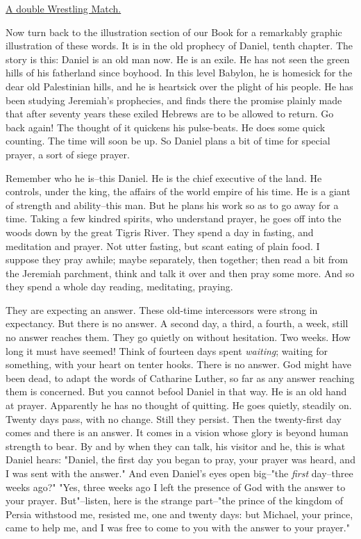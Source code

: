 \underline{A double Wrestling Match.}


Now turn back to the illustration section of our Book for a remarkably
graphic illustration of these words. It is in the old prophecy of Daniel,
tenth chapter. The story is this: Daniel is an old man now. He is an
exile. He has not seen the green hills of his fatherland since boyhood. In
this level Babylon, he is homesick for the dear old Palestinian hills, and
he is heartsick over the plight of his people. He has been studying
Jeremiah's prophecies, and finds there the promise plainly made that after
seventy years these exiled Hebrews are to be allowed to return. Go back
again! The thought of it quickens his pulse-beats. He does some quick
counting. The time will soon be up. So Daniel plans a bit of time for
special prayer, a sort of siege prayer.

Remember who he is--this Daniel. He is the chief executive of the land. He
controls, under the king, the affairs of the world empire of his time. He
is a giant of strength and ability--this man. But he plans his work so as
to go away for a time. Taking a few kindred spirits, who understand
prayer, he goes off into the woods down by the great Tigris River. They
spend a day in fasting, and meditation and prayer. Not utter fasting, but
scant eating of plain food. I suppose they pray awhile; maybe separately,
then together; then read a bit from the Jeremiah parchment, think and talk
it over and then pray some more. And so they spend a whole day reading,
meditating, praying.

They are expecting an answer. These old-time intercessors were strong in
expectancy. But there is no answer. A second day, a third, a fourth, a
week, still no answer reaches them. They go quietly on without hesitation.
Two weeks. How long it must have seemed! Think of fourteen days spent
\textit{waiting}; waiting for something, with your heart on tenter hooks. There
is no answer. God might have been dead, to adapt the words of Catharine
Luther, so far as any answer reaching them is concerned. But you cannot
befool Daniel in that way. He is an old hand at prayer. Apparently he has
no thought of quitting. He goes quietly, steadily on. Twenty days pass,
with no change. Still they persist. Then the twenty-first day comes and
there is an answer. It comes in a vision whose glory is beyond human
strength to bear. By and by when they can talk, his visitor and he, this
is what Daniel hears: "Daniel, the first day you began to pray, your
prayer was heard, and I was sent with the answer." And even Daniel's eyes
open big--"the \textit{first} day--three weeks ago?" "Yes, three weeks ago I left
the presence of God with the answer to your prayer. But"--listen, here is
the strange part--"the prince of the kingdom of Persia withstood me,
resisted me, one and twenty days: but Michael, your prince, came to help
me, and I was free to come to you with the answer to your prayer."

